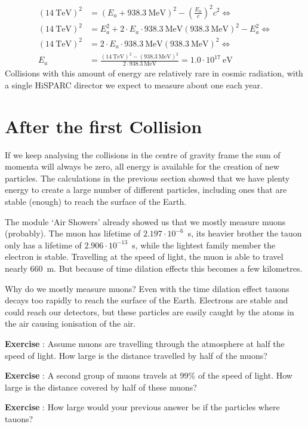 \begin{align}
\left( 14~\mbox{TeV} \right)^2 &= \left( E_a + 938.3~\mbox{MeV} \right)^2 - \left( \frac{E_a}{c} \right)^2 c^2 \Longleftrightarrow \\
\left( 14~\mbox{TeV} \right)^2 &= E_a^2 + 2 \cdot E_a \cdot 938.3~\mbox{MeV} \left( 938.3~\mbox{MeV} \right)^2 -E^2_a \Longleftrightarrow \\
\left( 14~\mbox{TeV} \right)^2 &= 2 \cdot E_a \cdot 938.3~\mbox{MeV} \left( 938.3~\mbox{MeV} \right)^2 \Longleftrightarrow \\
E_a &= \frac{\left( 14~\mbox{TeV} \right)^2 -\left( 938.3~\mbox{MeV} \right)^2 }{2 \cdot 938.3~\mbox{MeV}} = 1.0 \cdot 10^{17}~\mbox{eV}
\end{align}
Collisions with this amount of energy are relatively rare in cosmic radiation, with a single HiSPARC director we expect to measure about one each year.

\section{After the first Collision}
If we keep analysing the collisions in the centre of gravity frame the sum of momenta will always be zero, all energy is available for the creation of new particles. The calculations in the previous section showed that we have plenty energy to create a large number of different particles, including ones that are stable (enough) to reach the surface of the Earth.

The module `Air Showers' already showed us that we mostly measure muons (probably). The muon has lifetime of $2.197 \cdot 10^{-6}$~s, its heavier brother the tauon only has a lifetime of $2.906 \cdot 10^{-13}$~s, while the lightest family member the electron is stable. Travelling at the speed of light, the muon is able to travel nearly 660~m. But because of time dilation effects this becomes a few kilometres.

Why do we mostly measure muons? Even with the time dilation effect tauons decays too rapidly to reach the surface of the Earth. Electrons are stable and could reach our detectors, but these particles are easily caught by the atoms in the air causing ionisation of the air.


\begin{shaded}
\textbf{Exercise \theExercise {}} : Assume muons are travelling through the atmosphere at half the speed of light. How large is the distance travelled by half of the muons?\end{shaded}
\begin{shaded}
\textbf{Exercise \theExercise {}} : A second group of muons travels at 99\% of the speed of light. How large is the distance covered by half of these muons?\end{shaded}
\begin{shaded}
\textbf{Exercise \theExercise {}} : How large would your previous answer be if the particles where tauons?\end{shaded}



